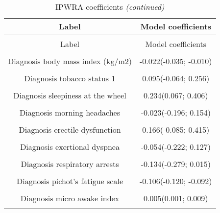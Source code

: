 \documentclass[../matsup.tex]{subfiles}
\begin{document}
\begin{longtable}[t]{cc}
\caption{\label{tab:IPWRA_coefficients}IPWRA coefficients}\\
\toprule
Label & Model coefficients\\
\midrule
\endfirsthead
\caption[]{IPWRA coefficients \textit{(continued)}}\\
\toprule
Label & Model coefficients\\
\midrule
\endhead

\endfoot
\bottomrule
\endlastfoot
\cellcolor{gray!6}{Diagnosis age (years)} & \cellcolor{gray!6}{-0.022(-0.029; -0.016)}\\
Diagnosis body mass index (kg/m2) & -0.022(-0.035; -0.010)\\
\cellcolor{gray!6}{Diagnosis cervical circumference} & \cellcolor{gray!6}{0.016(-0.003; 0.037)}\\
Diagnosis tobacco status 1 & 0.095(-0.064; 0.256)\\
\cellcolor{gray!6}{Diagnosis tobacco status 2} & \cellcolor{gray!6}{-0.157(-0.381; 0.072)}\\
Diagnosis sleepiness at the wheel & 0.234(0.067; 0.406)\\
\cellcolor{gray!6}{Diagnosis morning tiredness} & \cellcolor{gray!6}{-0.335(-0.524; -0.142)}\\
Diagnosis morning headaches & -0.023(-0.196; 0.154)\\
\cellcolor{gray!6}{Diagnosis libido disorder} & \cellcolor{gray!6}{-0.032(-0.255; 0.191)}\\
Diagnosis erectile dysfunction & 0.166(-0.085; 0.415)\\
\cellcolor{gray!6}{Diagnosis night sweating} & \cellcolor{gray!6}{-0.049(-0.233; 0.135)}\\
Diagnosis exertional dyspnea & -0.054(-0.222; 0.127)\\
\cellcolor{gray!6}{Diagnosis nocturia} & \cellcolor{gray!6}{0.017(-0.163; 0.180)}\\
Diagnosis respiratory arrests & -0.134(-0.279; 0.015)\\
\cellcolor{gray!6}{Diagnosis epworth sleepiness scale} & \cellcolor{gray!6}{0.347(0.326; 0.365)}\\
Diagnosis pichot's fatigue scale & -0.106(-0.120; -0.092)\\
\cellcolor{gray!6}{Diagnosis depression scale} & \cellcolor{gray!6}{-0.030(-0.056; -0.002)}\\
Diagnosis micro awake index & 0.005(0.001; 0.009)\\
\cellcolor{gray!6}{Diagnosis mean nocturnal SaO2} & \cellcolor{gray!6}{0.015(-0.004; 0.036)}\\

\end{longtable}
\end{document}
